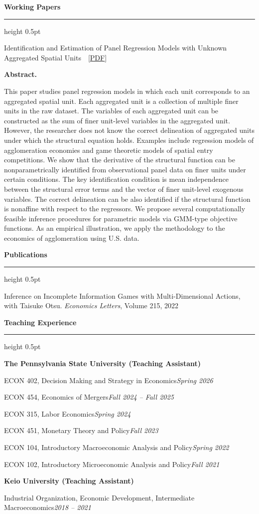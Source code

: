 \documentclass[10pt,letterpaper]{article}
\newcommand{\cvsection}[1]{%
  \vspace{1.05em}%
  {\fontsize{11.5}{14}\selectfont\bfseries #1}\par
  \vspace{3pt}%
  \hrule height 0.5pt
  \vspace{0.62em}%
}
\newenvironment{cvlist}{%
  \begin{list}{}{%
    \setlength{\leftmargin}{1.7em}%
    \setlength{\labelwidth}{0pt}%
    \setlength{\labelsep}{0pt}%
    \setlength{\itemsep}{0.50em}%
    \setlength{\parsep}{0pt}%
    \setlength{\topsep}{0pt}%
    \setlength{\partopsep}{0pt}%
  }%
}{\end{list}}
\newenvironment{cvlisttight}{%
  \begin{list}{}{%
    \setlength{\leftmargin}{1.7em}%
    \setlength{\labelwidth}{0pt}%
    \setlength{\labelsep}{0pt}%
    \setlength{\itemsep}{0.32em}%
    \setlength{\parsep}{0pt}%
    \setlength{\topsep}{0pt}%
    \setlength{\partopsep}{0pt}%
  }%
}{\end{list}}
\newcommand{\entry}{\item[]}
\newenvironment{abstractblock}{%
  \begingroup
  \fontsize{8.6}{11.3}\selectfont
  \begin{list}{}{%
    \setlength{\leftmargin}{0.9em}%
    \setlength{\rightmargin}{0.4em}%
    \setlength{\topsep}{0.15em}%
    \setlength{\parsep}{0pt}%
    \setlength{\itemsep}{0pt}%
  }\item[]\textbf{Abstract.}\ %
}{\end{list}\endgroup}
\newcommand{\dated}[2]{#1\hfill\textit{#2}}
\newcommand{\subhead}[1]{\item[]{\bfseries #1}}
\begin{document}
\cvsection{Working Papers}
\begin{cvlist}
\entry Identification and Estimation of Panel Regression Models with Unknown Aggregated
       Spatial Units\ \ [\href{https://thideyuki.netlify.app/Reg_space.pdf}{PDF}]
\item[]\vspace{-0.15em}
\begin{abstractblock}
This paper studies panel regression models in which each unit corresponds to an aggregated spatial unit. Each aggregated unit is a collection of multiple finer units in the raw dataset. The variables of each aggregated unit can be constructed as the sum of finer unit-level variables in the aggregated unit. However, the researcher does not know the correct delineation of aggregated units under which the structural equation holds. Examples include regression models of agglomeration economies and game theoretic models of spatial entry competitions. We show that the derivative of the structural function can be nonparametrically identified from observational panel data on finer units under certain conditions. The key identification condition is mean independence between the structural error terms and the vector of finer unit-level exogenous variables. The correct delineation can be also identified if the structural function is nonaffine with respect to the regressors. We propose several computationally feasible inference procedures for parametric models via GMM-type objective functions. As an empirical illustration, we apply the methodology to the economics of agglomeration using U.S. data.
\end{abstractblock}
\end{cvlist}

\cvsection{Publications}
\begin{cvlist}
\entry Inference on Incomplete Information Games with Multi-Dimensional Actions,
       with Taisuke Otsu. \textit{Economics Letters}, Volume 215, 2022
\end{cvlist}

\cvsection{Teaching Experience}
\begin{cvlisttight}
\subhead{The Pennsylvania State University (Teaching Assistant)}
\entry \dated{ECON 402, Decision Making and Strategy in Economics}{Spring 2026}
\entry \dated{ECON 454, Economics of Mergers}{Fall 2024 -- Fall 2025}
\entry \dated{ECON 315, Labor Economics}{Spring 2024}
\entry \dated{ECON 451, Monetary Theory and Policy}{Fall 2023}
\entry \dated{ECON 104, Introductory Macroeconomic Analysis and Policy}{Spring 2022}
\entry \dated{ECON 102, Introductory Microeconomic Analysis and Policy}{Fall 2021}
\vspace{0.45em}
\subhead{Keio University (Teaching Assistant)}
\entry \dated{Industrial Organization, Economic Development,
       Intermediate Macroeconomics}{2018 -- 2021}
\end{cvlisttight}
\end{document}
